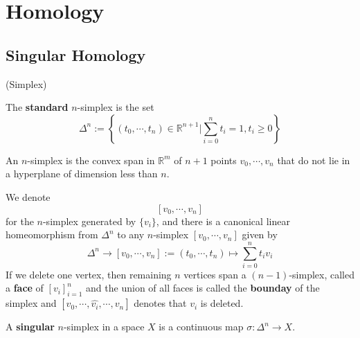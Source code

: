 \documentclass{article}
\begin{document}
\section{Homology}

\subsection{Singular Homology}

\begin{definition}(Simplex)\par
    The \textbf{standard} $n$-simplex is the set
    \[\Delta^n:=\left\{(t_0,\cdots,t_n)\in \mathbb{R}^{n+1}\Big|\sum\limits_{i=0}^n t_i = 1, t_i \geq 0\right\}\]\par

    An $n$-simplex is  the convex span in $\mathbb{R}^m$ of $n+1$ points $v_0,\cdots,v_n$ that do not lie in a hyperplane of dimension less than $n$.\par
    We denote
    \[[v_0,\cdots,v_n]\]
    for the $n$-simplex generated by $\{v_i\}$, and there is a canonical linear homeomorphism from $\Delta^n$ to any $n$-simplex $[v_0,\cdots,v_n]$ given by
    \[\Delta^n \to [v_0,\cdots,v_n]:= (t_0,\cdots,t_n)\mapsto \sum\limits_{i=0}^n t_iv_i\]
    If we delete one vertex, then remaining $n$ vertices span a $(n-1)$-simplex, called a \textbf{face} of $[v_i]_{i=1}^n$ and the union of all faces is called the \textbf{bounday} of the simplex and $[v_0,\cdots,\hat{v_i},\cdots,v_n]$ denotes that $v_i$ is deleted.
\end{definition}

\begin{definition}
    A \textbf{singular} $n$-simplex in a space $X$ is a continuous map $\sigma:\Delta^n \to X$.
\end{definition}
\end{document}
